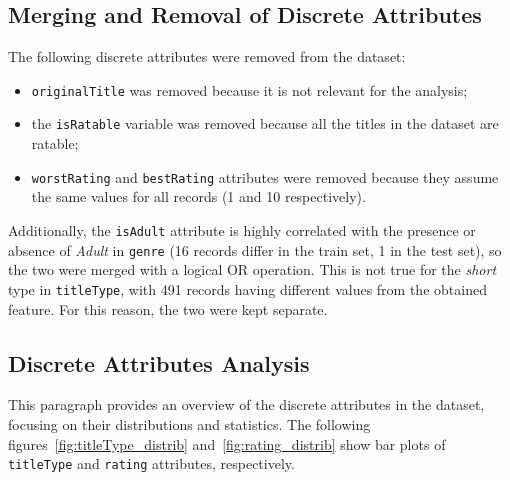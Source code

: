 \subsection{Merging and Removal of Discrete Attributes}\label{subsec:var_elim_discrete}
The following discrete attributes were removed from the dataset:
\begin{itemize}
    \item \texttt{originalTitle} was removed because it is not relevant for the analysis;
    \item the \texttt{isRatable} variable was removed because all the titles in the dataset are ratable;
    \item \texttt{worstRating} and \texttt{bestRating} attributes were removed because they assume the same values for all records (1 and 10 respectively).
\end{itemize}

Additionally, the \texttt{isAdult} attribute is highly correlated with the presence or absence of
\textit{Adult} in \texttt{genre} (16 records differ in the train set, 1 in the test set), so the two were
merged with a logical OR operation. This is not true for the \textit{short} type in \texttt{titleType}, with
491 records having different values from the obtained feature. For this reason, the two were kept separate.



\subsection{Discrete Attributes Analysis}
This paragraph provides an overview of the discrete attributes in the dataset, focusing on their distributions and statistics.
The following figures~\ref{fig:titleType_distrib} and~\ref{fig:rating_distrib} show bar plots of \texttt{titleType} and \texttt{rating} attributes, respectively.\\

